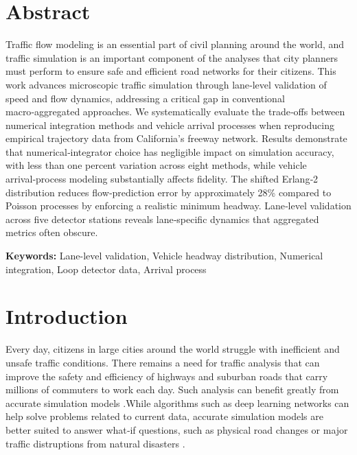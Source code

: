 \documentclass{scspaperproc}
\theoremstyle{scsthe}
\begin{document}
\section*{Abstract}
Traffic flow modeling is an essential part of civil planning around the world, and traffic simulation is an 
important component of the analyses that city planners must perform to ensure safe and efficient road networks for 
their citizens. This work advances microscopic traffic simulation through lane‑level validation of speed and flow 
dynamics, addressing a critical gap in conventional macro‑aggregated approaches. We systematically evaluate the 
trade‑offs between numerical integration methods and vehicle arrival processes when reproducing empirical trajectory 
data from California’s freeway network. Results demonstrate that numerical‑integrator choice has negligible impact 
on simulation accuracy, with less than one percent variation across eight methods, while vehicle arrival‑process modeling substantially affects fidelity. The shifted Erlang‑2 distribution reduces flow‑prediction error by approximately 
28\% compared to Poisson processes by enforcing a realistic minimum headway. Lane‑level validation across five 
detector stations reveals lane‑specific dynamics that aggregated metrics often obscure.

\textbf{Keywords: }{Lane-level validation, Vehicle headway distribution, Numerical integration, Loop detector data, Arrival process}


\section{Introduction}
\label{sec:intro}
Every day, citizens in large cities around the world struggle with inefficient and unsafe traffic conditions.
There remains a need for traffic analysis that can improve the safety and efficiency of highways and suburban roads that carry millions of commuters to work each day. Such analysis can benefit greatly from accurate simulation models \cite{law2007simulation}.While algorithms such as deep learning networks can help solve problems related to current data, accurate simulation models are better suited to answer what‑if questions, such as physical road changes or major traffic distruptions from natural disasters \cite{fishman2001discrete}.
\end{document}
